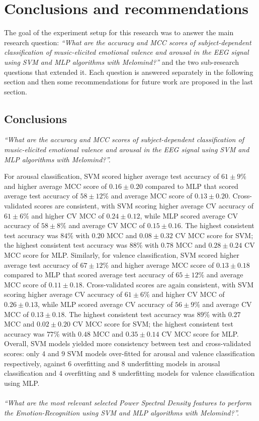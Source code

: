 \chapter{Conclusions and recommendations}
\label{chap:conclusions}
The goal of the experiment setup for this research was to answer the main research question: \emph{“What are the accuracy and MCC scores of subject-dependent classification of music-elicited emotional valence and arousal in the EEG signal using SVM and MLP algorithms with Melomind?”} and the two sub-research questions that extended it. Each question is answered separately in the following section and then some recommendations for future work are proposed in the last section.
\section{Conclusions}
\label{sec:conclusions}
\emph{“What are the accuracy and MCC scores of subject-dependent classification of music-elicited emotional valence and arousal in the EEG signal using SVM and MLP algorithms with Melomind?”. }

For arousal classification, \ac{SVM} scored higher average test accuracy of \(61\pm9\%\) and higher average \ac{MCC} score of \(0.16\pm0.20\) compared to \ac{MLP} that scored average test accuracy of \(58\pm12\% \) and average \ac{MCC} score of \(0.13\pm0.20\). Cross-validated scores are consistent, with \ac{SVM} scoring higher average CV accuracy of \(61\pm6\%\) and higher \ac{CV MCC} of \(0.24\pm0.12\), while \ac{MLP} scored average CV accuracy of \(58\pm8\%\) and average \ac{CV MCC} of \(0.15\pm0.16\). The highest consistent test accuracy was \(84\%\) with \(0.20\) \ac{MCC} and \( 0.08\pm0.32 \) \ac{CV MCC} score for \ac{SVM}; the highest consistent test accuracy was \(88\%\) with \(0.78\) \ac{MCC} and \( 0.28\pm0.24 \) \ac{CV MCC} score for \ac{MLP}. Similarly, for valence classification, \ac{SVM} scored higher average test accuracy of \(67\pm12\%\) and higher average \ac{MCC} score of \(0.13\pm0.18\) compared to \ac{MLP} that scored average test accuracy of \(65\pm12\% \) and average \ac{MCC} score of \(0.11\pm0.18\). Cross-validated scores are again consistent, with \ac{SVM} scoring higher average CV accuracy of \(61\pm6\%\) and higher \ac{CV MCC} of \(0.26\pm0.13\), while \ac{MLP} scored average CV accuracy of \(56\pm9\%\) and average \ac{CV MCC} of \(0.13\pm0.18\). The highest consistent test accuracy was \(89\%\) with \(0.27\) \ac{MCC} and \( 0.02\pm0.20 \) \ac{CV MCC} score for \ac{SVM}; the highest consistent test accuracy was \(77\%\) with \(0.48\) \ac{MCC} and \( 0.35\pm0.14 \) \ac{CV MCC} score for \ac{MLP}. Overall, \ac{SVM} models yielded more consistency between test and cross-validated scores: only 4 and 9 \ac{SVM} models over-fitted for arousal and valence classification respectively, against 6 overfitting and 8 underfitting models in arousal classification and 4 overfitting and 8 underfitting models for valence classification using \ac{MLP}.
\\
\\
\emph{“What are the most relevant selected Power Spectral Density features to perform the Emotion-Recognition using SVM and MLP algorithms with Melomind?”.}

